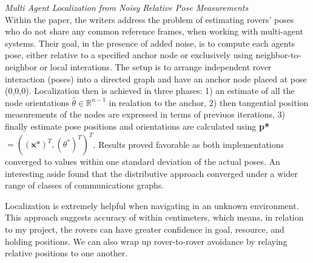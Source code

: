 \textit{Multi Agent Localization from Noisy Relative Pose Measurements}~\cite{aragues2011multi} \\

Within the paper, the writers address the problem of estimating rovers' poses who do not share any common reference frames, when working with multi-agent systems. Their goal, in the presence of added noise, is to compute each agents pose, either relative to a specified anchor node or exclusively using neighbor-to-neighbor or local interations. The setup is to arrange independent rover interaction (poses) into a directed graph and have an anchor node placed at pose (0,0,0). Localization then is achieved in three phases: 1) an estimate of all the node orientations $\hat{\theta} \in \mathbb{R}^{n-1}$ in realation to the anchor, 2) then tangential position measurements of the nodes are expressed in terms of previuos iterations, 3) finally estimate pose positions and orientations are calculated using \textbf{p*} $= ( (\textbf{x*})^T, (\theta^*)^T )^T$. Results proved favorable as both implementations converged to values within one standard deviation of the actual poses. An interesting aside found that the distributive approach converged under a wider range of classes of communications graphs.

Localization is extremely helpful when navigating in an unknown environment. This approach suggests accuracy of within centimeters, which means, in relation to my project, the rovers can have greater confidence in goal, resource, and holding positions. We can also wrap up rover-to-rover avoidance by relaying relative positions to one another.